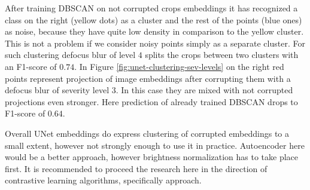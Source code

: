 After training DBSCAN on not corrupted crops embeddings it has recognized a class on the right (yellow dots) as a cluster and the rest of the points (blue ones) as noise, because they have quite low density in comparison to the yellow cluster. This is not a problem if we consider noisy points simply as a separate cluster. For such clustering defocus blur of level $4$ splits the crops between two clusters with an F1-score of $0.74$. In Figure \ref{fig:unet-clustering-sev-levels} on the right red points represent projection of image embeddings after corrupting them with a defocus blur of severity level $3$. In this case they are mixed with not corrupted projections even stronger. Here prediction of already trained DBSCAN drops to F1-score of $0.64$.

Overall UNet embeddings do express clustering of corrupted embeddings to a small extent, however not strongly enough to use it in practice. Autoencoder here would be a better approach, however brightness normalization has to take place first. It is recommended to proceed the research here in the direction of contrastive learning algorithms, specifically \cite{csi} approach.